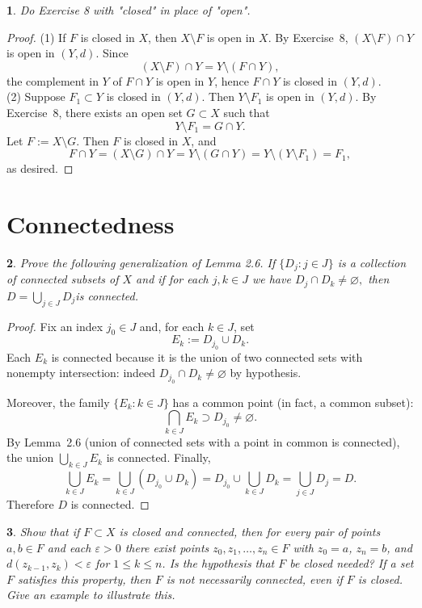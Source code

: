 \documentclass[12pt, a4paper]{report}
\theoremstyle{spaced}
\newtheorem{exercise}{}
\newcommand{\setexercise}[1]{\setcounter{exercise}{#1-1}}
\begin{document}
\setexercise{9}
\begin{exercise}
	Do Exercise 8 with "closed" in place of "open".
\end{exercise}
\begin{proof}
	(1) If $F$ is closed in $X$, then $X\setminus F$ is open in $X$. By Exercise~8,
	$(X\setminus F)\cap Y$ is open in $(Y,d)$. Since
	\[
		(X\setminus F)\cap Y=Y\setminus(F\cap Y),
	\]
	the complement in $Y$ of $F\cap Y$ is open in $Y$, hence $F\cap Y$ is closed in $(Y,d)$.\\

	(2) Suppose $F_1\subset Y$ is closed in $(Y,d)$. Then $Y\setminus F_1$ is open in $(Y,d)$.
	By Exercise~8, there exists an open set $G\subset X$ such that
	\[
		Y\setminus F_1=G\cap Y.
	\]
	Let $F:=X\setminus G$. Then $F$ is closed in $X$, and
	\[
		F\cap Y=(X\setminus G)\cap Y
		=Y\setminus(G\cap Y)
		=Y\setminus(Y\setminus F_1)
		=F_1,
	\]
	as desired.
\end{proof}

\section{Connectedness}
\setexercise{4}
\begin{exercise}
	Prove the following generalization of Lemma 2.6.
	If $\{D_j : j \in J\}$ is a collection of connected subsets of $X$ and if for each $j,k \in J$ we have \(D_j \cap D_k \neq \varnothing,\)
	then \(D = \bigcup_{j \in J} D_j\)is connected.
\end{exercise}
\begin{proof}
	Fix an index $j_0 \in J$ and, for each $k \in J$, set
	\[
		E_k := D_{j_0} \cup D_k.
	\]
	Each $E_k$ is connected because it is the union of two connected sets with nonempty
	intersection:
	indeed $D_{j_0} \cap D_k \neq \varnothing$ by hypothesis.

	Moreover, the family $\{E_k : k \in J\}$ has a common point (in fact, a common subset):
	\[
		\bigcap_{k \in J} E_k \supset D_{j_0} \neq \varnothing.
	\]
	By Lemma~2.6 (union of connected sets with a point in common is connected),
	the union $\bigcup_{k \in J} E_k$ is connected. Finally,
	\[
		\bigcup_{k \in J} E_k
		= \bigcup_{k \in J} (D_{j_0} \cup D_k)
		= D_{j_0} \cup \bigcup_{k \in J} D_k
		= \bigcup_{j \in J} D_j
		= D.
	\]
	Therefore $D$ is connected.
\end{proof}

\setexercise{5}
\begin{exercise}
	Show that if \(F \subset X\) is closed and connected, then for every pair of points
	\(a,b \in F\) and each \(\varepsilon>0\) there exist points
	\(z_0,z_1,\ldots,z_n \in F\) with \(z_0=a\), \(z_n=b\), and
	\(d(z_{k-1},z_k) < \varepsilon\) for \(1 \le k \le n\).
	Is the hypothesis that \(F\) be closed needed?
	If a set \(F\) satisfies this property, then \(F\) is not necessarily connected,
	even if \(F\) is closed. Give an example to illustrate this.
\end{exercise}
\end{document}
